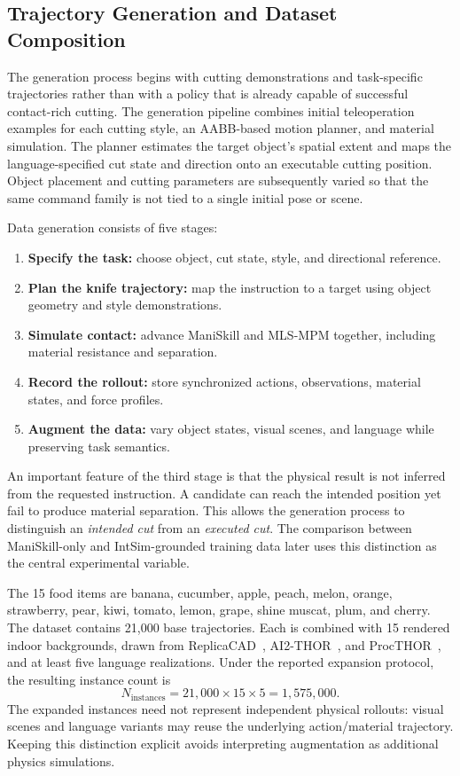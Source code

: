 \subsection{Trajectory Generation and Dataset Composition}
\label{subsec:cut_dataset}

The generation process begins with cutting demonstrations and task-specific trajectories rather than with a policy that is already capable of successful contact-rich cutting. The generation pipeline combines initial teleoperation examples for each cutting style, an AABB-based motion planner, and material simulation. The planner estimates the target object's spatial extent and maps the language-specified cut state and direction onto an executable cutting position. Object placement and cutting parameters are subsequently varied so that the same command family is not tied to a single initial pose or scene.

Data generation consists of five stages:
\begin{enumerate}
  \item \textbf{Specify the task:} choose object, cut state, style, and directional reference.
  \item \textbf{Plan the knife trajectory:} map the instruction to a target using object geometry and style demonstrations.
  \item \textbf{Simulate contact:} advance ManiSkill and MLS-MPM together, including material resistance and separation.
  \item \textbf{Record the rollout:} store synchronized actions, observations, material states, and force profiles.
  \item \textbf{Augment the data:} vary object states, visual scenes, and language while preserving task semantics.
\end{enumerate}

An important feature of the third stage is that the physical result is not inferred from the requested instruction. A candidate can reach the intended position yet fail to produce material separation. This allows the generation process to distinguish an \emph{intended cut} from an \emph{executed cut}. The comparison between ManiSkill-only and IntSim-grounded training data later uses this distinction as the central experimental variable.

The 15 food items are banana, cucumber, apple, peach, melon, orange, strawberry, pear, kiwi, tomato, lemon, grape, shine muscat, plum, and cherry. The dataset contains 21,000 base trajectories. Each is combined with 15 rendered indoor backgrounds, drawn from ReplicaCAD~\citep{szot2021habitat}, AI2-THOR~\citep{kolve2017ai2}, and ProcTHOR~\citep{deitke2022}, and at least five language realizations. Under the reported expansion protocol, the resulting instance count is
\begin{equation}\label{eq:cut_dataset_size}
  N_{\mathrm{instances}}
   =21{,}000\times15\times5
   =1{,}575{,}000.
\end{equation}
The expanded instances need not represent independent physical rollouts: visual scenes and language variants may reuse the underlying action/material trajectory. Keeping this distinction explicit avoids interpreting augmentation as additional physics simulations.

